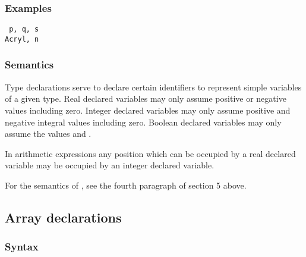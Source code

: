 \documentclass[a4paper,11pt]{article}
\begin{document}
\subsubsection{Examples}

\begin{flushleft}
\texttt{ p, q, s\\
  Acryl, n}\\
\end{flushleft}

\subsubsection{Semantics}
\label{LblTypeDeclarationsSemantics}

Type declarations serve to declare certain identifiers to represent
simple variables of a given type.  Real declared variables may only
assume positive or negative values including zero.  Integer declared
variables may only assume positive and negative integral values
including zero.  Boolean declared variables may only assume the values
 and .

In arithmetic expressions any position which can be occupied by a real
declared variable may be occupied by an integer declared variable.

For the semantics of , see the fourth paragraph of section 5
above.



\subsection{Array declarations}
\label{LblArrayDeclarations}

\subsubsection{Syntax}
\label{LblArrayDeclarationsSyntax}
\end{document}
